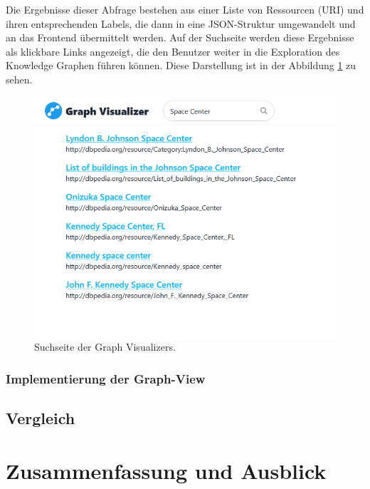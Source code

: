 Die Ergebnisse dieser Abfrage bestehen aus einer Liste von Ressourcen (URI) und ihren entsprechenden Labels, die dann in eine JSON-Struktur umgewandelt und an das Frontend übermittelt werden. Auf der Suchseite werden diese Ergebnisse als klickbare Links angezeigt, die den Benutzer weiter in die Exploration des Knowledge Graphen führen können. Diese Darstellung ist in der Abbildung \ref{fig:realization:implementation:searchpage} zu sehen.

\begin{figure}[h]
    \centering
    \includegraphics[height=.8\textwidth]{images/03/SearchResults.png}
    \caption{Suchseite der Graph Visualizers.}
    \label{fig:realization:implementation:searchpage}
\end{figure}

\subsection{Implementierung der Graph-View}

\section{Vergleich}
\label{realization:comparison}

\chapter{Zusammenfassung und Ausblick}